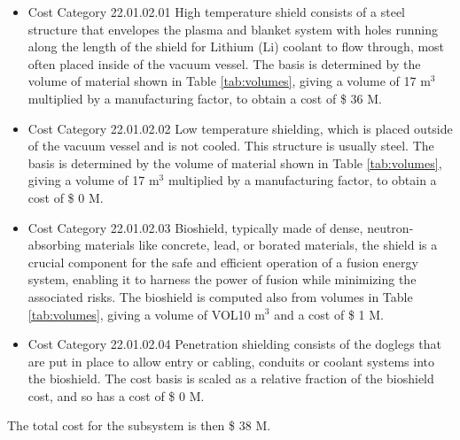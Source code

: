 \begin{itemize}
    \item Cost Category 22.01.02.01 High temperature shield consists of a steel structure that envelopes the plasma and blanket system with holes running along the length of the shield for Lithium (Li) coolant to flow through, most often placed inside of the vacuum vessel. The basis is determined by the volume of material shown in Table \ref{tab:volumes}, giving a volume of 17  m$^{3}$ multiplied by a manufacturing factor, to obtain a cost of \$ 36 M. %
    \item Cost Category 22.01.02.02 Low temperature shielding, which is placed outside of the vacuum vessel and is not cooled.  This structure is usually steel.  The basis is determined by the volume of material shown in Table \ref{tab:volumes}, giving a volume of 17  m$^{3}$ multiplied by a manufacturing factor, to obtain a cost of \$ 0 M.
    \item Cost Category 22.01.02.03 Bioshield, typically made of dense, neutron-absorbing materials like concrete, lead, or borated materials, the shield is a crucial component for the safe and efficient operation of a fusion energy system, enabling it to harness the power of fusion while minimizing the associated risks.  The bioshield is computed also from volumes in Table \ref{tab:volumes}, giving a volume of VOL10 m$^{3}$ and a cost of \$ 1 M. 
    \item Cost Category 22.01.02.04 Penetration shielding consists of the doglegs that are put in place to allow entry or cabling, conduits or coolant systems into the bioshield.  The cost basis is scaled as a relative fraction of the bioshield cost, and so has a cost of \$ 0 M.
\end{itemize}

The total cost for the subsystem is then \$ 38 M.




